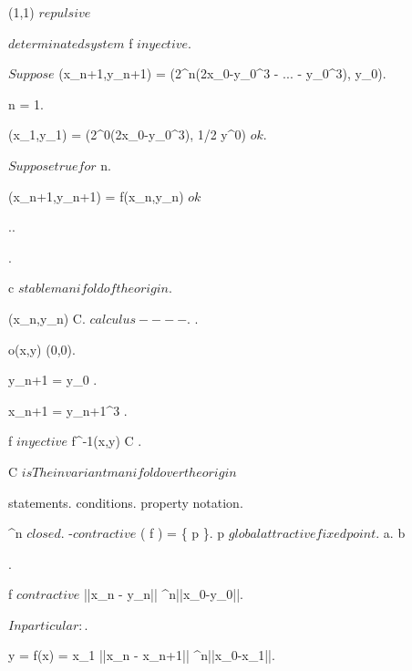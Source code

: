 \documentclass[../Main/main]{subfiles}
\begin{document}
{{{			(1,1) $ repulsive $
		}
	}
	
	
	{
		{
		}
		\holds
		{
			 $ determinated system $ \imp f $ inyective $.

			$Suppose$ (x_{n+1},y_{n+1}) = (2^n(2x_0-y_0^3 - ... - y_0^3), y_0).

			{
				n = 1.

				(x_1,y_1) = (2^0(2x_0-y_0^3), 1/2 y^0) $ok$.

				{
					$ Suppose true for $ n.

					(x_{n+1},y_{n+1}) = f(x_n,y_n) $ok$
				}
			}..

			.

			c $ stable manifold of the origin $.

			{
				{
					(x_n,y_n) \in C.
					$calculus----$.
				}.

				o(x,y) \convergesto (0,0).

				y_{n+1} = y_0 .

				x_{n+1} = y_{n+1}^3 .

			}

			f $ inyective $ \imp {}
			{
				f^{-1}(x,y) \in C
			}.

			C $ is The invariant manifold over the origin $
		}
	}
	

	{
		{
			statements.
		}
		{
			conditions.
		}
		\denote
		{
			property \as notation.
		}
	}
	
	
	
	
	{
		{
			\Uc \subset \R^n $ closed $.
			 \lambda-$contractive$
		}
		\holds
		{
			\fixed( f ) = \{ p \}.
			p $ global attractive fixed point $.
			a.
			b		
		}
		\demonstration
		{
			{
			}.

			f $ contractive $ \imp ||x_n - y_n|| \leq \lambda^n||x_0-y_0||.

			$In particular:$.

			y = f(x) = x_1 \imp ||x_n - x_{n+1}|| \leq \lambda^n||x_0-x_1||.

}}}
\end{document}
